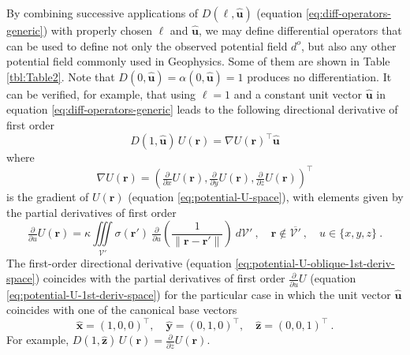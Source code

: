 \documentclass[manuscript,noblind]{geophysics}
\begin{document}
	By combining successive applications of $D(\ell, \hat{\mathbf{u}})$ (equation \ref{eq:diff-operators-generic})
	with properly chosen $\ell$ and $\hat{\mathbf{u}}$, we may define differential operators that 
	can be used to define not only the observed potential field $d^{o}$, but also any other potential 
	field commonly used in Geophysics.
	Some of them are shown in Table \ref{tbl:Table2}.
	Note that $D(0, \hat{\mathbf{u}}) = \alpha(0, \hat{\mathbf{u}}) = 1$ produces no differentiation.
	It can be verified, for example, that using $\ell = 1$ and a constant unit vector $\hat{\mathbf{u}}$
	in equation \ref{eq:diff-operators-generic} leads to the following directional derivative 
	of first order
	\begin{equation}
		D(1, \hat{\mathbf{u}}) \, U(\mathbf{r}) = \nabla U(\mathbf{r})^{\top} \hat{\mathbf{u}}
		\label{eq:potential-U-oblique-1st-deriv-space}
	\end{equation}
	where
	\begin{equation}
		\nabla U(\mathbf{r}) = \left( 
		\tfrac{\partial}{\partial x} U(\mathbf{r}),
		\tfrac{\partial}{\partial y} U(\mathbf{r}),
		\tfrac{\partial}{\partial z} U(\mathbf{r}) \right)^{\top}
		\label{eq:potential-U-grad-space}
	\end{equation}
	is the gradient of $U(\mathbf{r})$ (equation \ref{eq:potential-U-space}), with elements
	given by the partial derivatives of first order
	\begin{equation}
		\tfrac{\partial}{\partial u} U(\mathbf{r}) = \kappa \iiint\limits_{\mathcal{V}'}
		\sigma(\mathbf{r}') \: 
		\tfrac{\partial}{\partial u} \left( \frac{1}{\| \mathbf{r} - \mathbf{r}'\|} \right)
		\: d\mathcal{V}' \: , 
		\quad \mathbf{r} \notin \overline{\mathcal{V}'} \: , \quad u \in \{ x, y, z \} \: .
		\label{eq:potential-U-1st-deriv-space}
	\end{equation}
	The first-order directional derivative (equation \ref{eq:potential-U-oblique-1st-deriv-space})
	coincides with the partial derivatives of first order $\tfrac{\partial}{\partial u} U$ (equation \ref{eq:potential-U-1st-deriv-space})
	for the particular case in which the unit vector $\hat{\mathbf{u}}$ coincides with one of the canonical base vectors
	\begin{equation}
		\hat{\mathbf{x}} = (1,0,0)^{\top} , \quad 
		\hat{\mathbf{y}} = (0,1,0)^{\top} , \quad
		\hat{\mathbf{z}} = (0,0,1)^{\top} \: .
		\label{eq:canonical-base-vector}
	\end{equation}
	For example, $D(1, \hat{\mathbf{z}}) \, U(\mathbf{r}) = \tfrac{\partial}{\partial z} U(\mathbf{r})$.
	
\end{document}
